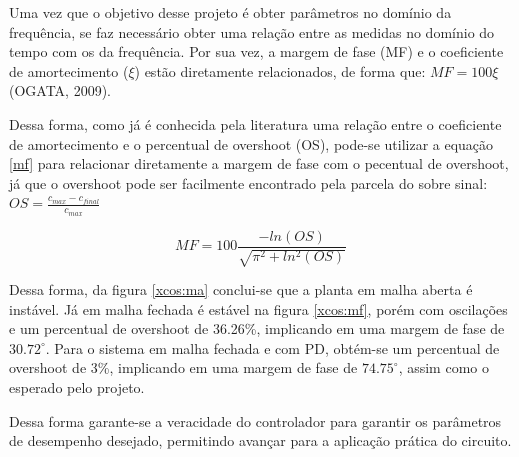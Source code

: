 Uma vez que o objetivo desse projeto é obter parâmetros no domínio da frequência, se faz necessário obter uma relação entre as medidas no domínio do tempo com os da frequência. Por sua vez, a margem de fase (MF) e o coeficiente de amortecimento ($\xi$) estão diretamente relacionados, de forma que: $MF = 100\xi$ (OGATA, 2009). 

Dessa forma, como já é conhecida pela literatura uma relação entre o coeficiente de amortecimento e o percentual de overshoot (OS), pode-se utilizar a equação \ref{mf} para relacionar diretamente a margem de fase com o pecentual de overshoot, já que o overshoot pode ser facilmente encontrado pela parcela do sobre sinal: $OS = \frac{c_{max}-c_{final}}{c_{max}}$

\begin{equation} \label{mf}
MF = 100\frac{-ln(OS)}{\sqrt{\pi^2+ln^2(OS)}}
\end{equation}

Dessa forma, da figura \ref{xcos:ma} conclui-se que a planta em malha aberta é instável. Já em malha fechada é estável na figura \ref{xcos:mf}, porém com oscilações e um percentual de overshoot de 36.26\%, implicando em uma margem de fase de $30.72^{\circ}$. Para o sistema em malha fechada e com PD, obtém-se um percentual de overshoot de 3\%, implicando em uma margem de fase de $74.75^{\circ}$, assim como o esperado pelo projeto.

Dessa forma garante-se a veracidade do controlador para garantir os parâmetros de desempenho desejado, permitindo avançar para a aplicação prática do circuito.

\pagebreak
